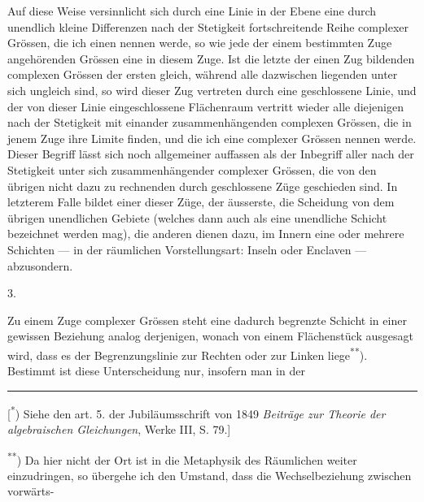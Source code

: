 Auf diese Weise versinnlicht sich durch eine Linie in der Ebene eine durch unendlich kleine Differenzen nach der Stetigkeit fortschreitende Reihe complexer Grössen, die ich einen  nennen werde, so wie jede der einem bestimmten Zuge angehörenden Grössen eine  in diesem Zuge. Ist die letzte der einen Zug bildenden complexen Grössen der ersten gleich, während alle dazwischen liegenden unter sich ungleich sind, so wird dieser  Zug vertreten durch eine geschlossene Linie, und der von dieser Linie eingeschlossene Flächenraum vertritt wieder alle diejenigen nach der Stetigkeit mit einander zusammenhängenden complexen Grössen, die in jenem Zuge ihre Limite finden, und die ich eine  complexer Grössen nennen werde. Dieser Begriff lässt sich noch allgemeiner auffassen als der Inbegriff aller nach der Stetigkeit unter sich zusammenhängender complexer Grössen, die von den übrigen nicht dazu zu rechnenden durch  geschlossene Züge geschieden sind. In letzterem Falle bildet einer dieser Züge, der äusserste, die Scheidung von dem übrigen unendlichen Gebiete (welches dann auch als eine unendliche Schicht bezeichnet werden mag), die anderen dienen dazu, im Innern eine oder mehrere Schichten --- in der räumlichen Vorstellungsart: Inseln oder Enclaven --- abzusondern.
\begin{center}3.\end{center}
\noindent\hspace*{\parindent}Zu einem Zuge complexer Grössen steht eine dadurch begrenzte Schicht in einer gewissen Beziehung analog derjenigen, wonach von einem Flächenstück ausgesagt wird, dass es der Begrenzungslinie zur Rechten oder zur Linken liege\textsuperscript{**}). Bestimmt ist diese Unterscheidung nur, insofern man in der
\par\vfill\noindent\rule{.25\linewidth}{.4pt}\par\smallskip
{\footnotesize
\noindent\hspace*{\parindent}[\textsuperscript{*}) Siehe den art. {\scriptsize 5}. der Jubiläumsschrift von {\scriptsize 1849} \textit{Beiträge zur Theorie der algebraischen Gleichungen}, Werke III, S. {\scriptsize 79}.]\par
\noindent\hspace*{\parindent}\textsuperscript{**}) Da hier nicht der Ort ist in die Metaphysik des Räumlichen weiter einzudringen, so übergehe ich den Umstand, dass die Wechselbeziehung zwischen vorwärts-\par}
